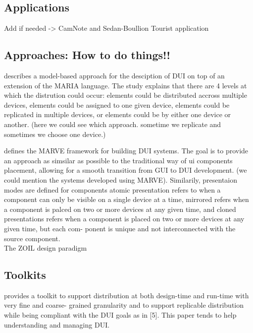 \subsection{Applications}
Add if needed -> \cite{demeure20084c} CamNote and  Sedan-Boullion Tourist
application

\subsection{Approaches: How to do things!!}
\cite{manca2011distributing} describes a model-based approach for the desciption
of DUI on top of an extension of the MARIA language. The study explains that
there are 4 levels at which the distrution could occur: elements could be
distributed accross multiple devices, elements could be assigned to one given
device, elements could be replicated in multiple devices, or elements could be
by either one device or another. (here we could see which approach. sometime we
replicate and sometimes we choose one device.)

\cite{froberg2011model} defines the MARVE framework for building DUI
systems. The goal is to provide an approach as simsilar as possible to
the traditional way of ui components placement, allowing for a smooth
transition from GUI to DUI development. (we could mention the systems
developed using MARVE). Similarily, presentaion modes are defined for components
atomic presentation refers to when a component can only be visible on a single
device at a time, mirrored refers when a component is palced on two or more
devices at any given time, and cloned presentations refers when a component is
placed on two or more devices at any given time, but each com- ponent is unique
and not interconnected with the source component.\\

The ZOIL design paradigm \cite{jetter2012design}
 
\subsection{Toolkits}
\cite{melchior2011distribution} provides a toolkit to support distribution
at both design-time and run-time with very fine and coarse- grained granularity and to support replicable distribution while being compliant with the DUI goals as in [5]. This paper tends to help understanding and managing DUI.\\


